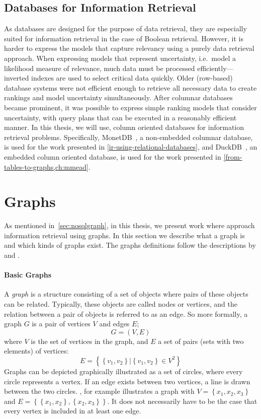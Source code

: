 \subsection{Databases for Information Retrieval}
As databases are designed for the purpose of data retrieval, they are especially suited for information retrieval in the case of Boolean retrieval. However, it is harder to express the models that capture relevancy using a purely data retrieval approach.
When expressing models that represent uncertainty, i.e.\ model a likelihood measure of relevance, much data must be processed efficiently—inverted indexes are used to select critical data quickly. Older (row-based) database systems were not efficient enough to retrieve all necessary data to create rankings and model uncertainty simultaneously. After columnar databases became prominent, it was possible to express simple ranking models that consider uncertainty, with query plans that can be executed in a reasonably efficient manner. In this thesis, we will use, column oriented databases for information retrieval problems. Specifically, MonetDB~\citep{monet}, a non-embedded columnar database, is used for the work presented in \cref{ir-using-relational-databases}, and DuckDB~\citep{duckdb}, an embedded column oriented database, is used for the work presented in \cref{from-tables-to-graphs,ch:mmead}.

\section{Graphs}
\label{sec:graphs}
As mentioned in~\cref{sec:nosqlgraph}, in this thesis, we present work where approach information retrieval using graphs. In this section we describe what a graph is and which kinds of graphs exist. The graphs definitions follow the descriptions by \citet{big-graphs} and \citet{angles2018property}.

\paragraph{Basic Graphs}
A \emph{graph} is a structure consisting of a set of objects where pairs of these objects can be related. Typically, these objects are called nodes or vertices, and the relation between a pair of objects is referred to as an edge. So more formally, a graph $G$ is a pair of vertices $V$ and edges $E$;
\begin{equation}
	G = (V, E)
\end{equation}
where $V$ is the set of vertices in the graph, and $E$ a set of pairs (sets with two elements) of vertices:
\begin{equation}
	E = \left\{\left\{v_1, v_2\right\} | \left\{v_1, v_2\right\} \in V^2\right\}
	\label{undirected-edges}
\end{equation}
Graphs  can be depicted graphically illustrated as a set of circles, where every circle represents a vertex. If an edge exists between two vertices, a line is drawn between the two circles. , for example illustrates a graph with $V = \left\{x_1, x_2, x_3\right\}$ and $E = \left\{\left\{x_1, x_2\right\}, \left\{x_2, x_3\right\}\right\}$. It does not necessarily have to be the case that every vertex is included in at least one edge.

